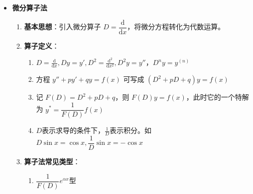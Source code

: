 \documentclass[../book.tex]{subfiles}
\begin{document}
\begin{enumerate}
\begin{itemize}
\begin{enumerate}
                \item 当自由项 $f(x) = e^{\alpha x}[P_m(x)\cos\beta x + P_n(x)\sin\beta x]$，即$y'' + py' + qy = e^{\alpha x}[P_m(x)\cos\beta x + P_n(x)\sin\beta x]$，特解设为
                \[
                    y^* = e^{\alpha x}[Q_l^{(1)}(x)\cos\beta x + Q_l^{(2)}(x)\sin\beta x]x^k
                \]
                其中
                \[
                    \begin{cases}
                        e^{\alpha x} \text{照抄} \\[6pt]
                        l = \max\{m, n\} Q_l^{(1)}(x), Q_l^{(2)}(x) \text{ 都是 } m \text{ 次多项式，系数待定} \\[6pt]
                        k = \begin{cases}
                                0, &  \alpha \pm \beta i \neq r_{1, 2} \\
                                1, &  \alpha \pm \beta i = r_{1, 2}
                        \end{cases}
                    \end{cases}
                \]
            \end{enumerate}

            \item \textbf{微分算子法}
            \begin{enumerate}
                \item \textbf{基本思想}：引入微分算子 $D = \dfrac{\mathrm{d}}{\mathrm{d}x}$，将微分方程转化为代数运算。
                \item \textbf{算子定义}：
                \begin{enumerate}
                    \item $D = \displaystyle\frac{\mathrm{d}}{\mathrm{d}x}, Dy = y', D^2 = \displaystyle\frac{\mathrm{d}^2}{\mathrm{d}x^2}, D^2y = y''$，$D^ny = y^{(n)}$
                    \item 方程 $y'' + py' + qy = f(x)$ 可写成 $(D^2 + pD + q)y = f(x)$
                    \item 记 $F(D) = D^2 + pD + q$，则 $F(D)y = f(x)$，此时它的一个特解为 $y^* = \dfrac{1}{F(D)}f(x)$
                    \item $D$表示求导的条件下，$\displaystyle\frac{1}{D}$表示积分。如$D\sin x = \cos x, \dfrac{1}{D}\sin x = -\cos x$
                \end{enumerate}
                \item \textbf{算子法常见类型}：

                \begin{enumerate}
                    \item $\dfrac{1}{F(D)}e^{\alpha x} $型


\end{enumerate}
\end{enumerate}
\end{itemize}
\end{enumerate}
\end{document}
